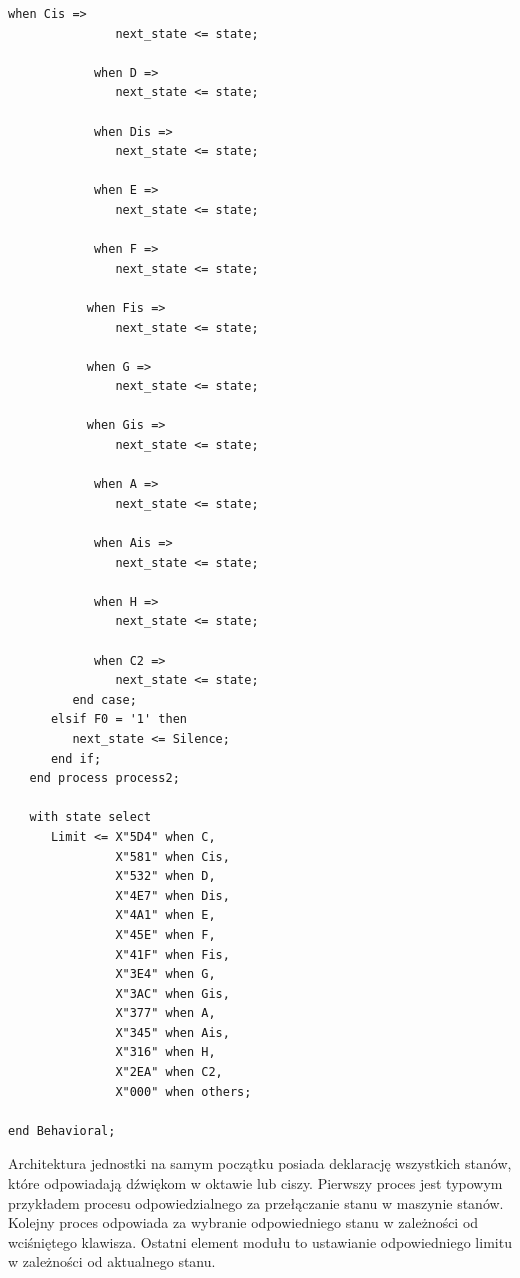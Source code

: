 \documentclass[a4paper,11pt]{article}
\begin{document}
\begin{lstlisting}[caption=Procesy modułu Modulator2.]
            when Cis =>
               next_state <= state;
               
            when D =>
               next_state <= state;
               
            when Dis =>
               next_state <= state;
            
            when E =>
               next_state <= state;
               
            when F =>
               next_state <= state;
               
           when Fis =>
               next_state <= state;
               
           when G =>
               next_state <= state;
           
           when Gis =>
               next_state <= state;
               
            when A =>
               next_state <= state;
               
            when Ais =>
               next_state <= state;
               
            when H =>
               next_state <= state;
               
            when C2 =>
               next_state <= state;
         end case;
      elsif F0 = '1' then
         next_state <= Silence;
      end if;
   end process process2;
   
   with state select
      Limit <= X"5D4" when C,
               X"581" when Cis,
               X"532" when D,
               X"4E7" when Dis,
               X"4A1" when E,
               X"45E" when F,
               X"41F" when Fis,
               X"3E4" when G,
               X"3AC" when Gis,
               X"377" when A,
               X"345" when Ais,
               X"316" when H,
               X"2EA" when C2,
               X"000" when others;

end Behavioral;
\end{lstlisting}
Architektura jednostki na samym początku posiada deklarację wszystkich stanów, które odpowiadają dźwiękom w oktawie lub ciszy.
Pierwszy proces jest typowym przykładem procesu odpowiedzialnego za przełączanie stanu w maszynie stanów. Kolejny proces odpowiada za wybranie odpowiedniego stanu w zależności od wciśniętego klawisza. Ostatni element modułu to ustawianie odpowiedniego limitu w zależności od aktualnego stanu.
\end{document}
